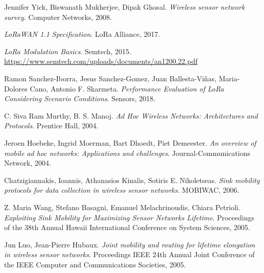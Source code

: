 \documentclass[a4paper,11pt]{article}
\theoremstyle{definition}
\begin{document}
\begin{thebibliography}{0}

Jennifer Yick, Biswanath Mukherjee, Dipak Ghosal.
\textit{Wireless sensor network survey}.
Computer Networks, 2008.

\textit{LoRaWAN 1.1 Specification}.
LoRa Alliance, 2017.

\textit{LoRa Modulation Basics}.
Semtech, 2015.
\url{https://www.semtech.com/uploads/documents/an1200.22.pdf}

Ramon Sanchez-Iborra, Jesus Sanchez-Gomez, Juan Ballesta-Viñas, Maria-Dolores Cano, Antonio F. Skarmeta.
\textit{Performance Evaluation of LoRa Considering Scenario Conditions}. 
Sensors, 2018.

C. Siva Ram Murthy, B. S. Manoj.
\textit{Ad Hoc Wireless Networks: Architectures and Protocols}.
Prentice Hall, 2004.

Jeroen Hoebeke, Ingrid Moerman, Bart Dhoedt, Piet Demeester.
\textit{An overview of mobile ad hoc networks: Applications and challenges}.
Journal-Communications Network, 2004.

Chatzigiannakis, Ioannis, Athanasios Kinalis, Sotiris E. Nikoletseas.
\textit{Sink mobility protocols for data collection in wireless sensor networks}.
MOBIWAC, 2006.

Z. Maria Wang, Stefano Basagni, Emanuel Melachrinoudis, Chiara Petrioli.
\textit{Exploiting Sink Mobility for Maximizing Sensor Networks Lifetime}.
Proceedings of the 38th Annual Hawaii International Conference on System Sciences, 2005.

Jun Luo, Jean-Pierre Hubaux.
\textit{Joint mobility and routing for lifetime elongation in wireless sensor networks}.
Proceedings IEEE 24th Annual Joint Conference of the IEEE Computer and Communications Societies, 2005.

\end{thebibliography}
\end{document}
